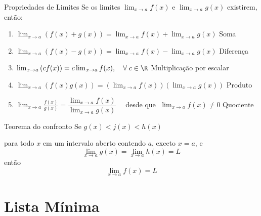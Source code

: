\documentclass[fleqn,utf8,aspectratio=169,12pt,ignorenonframetext]{beamer}
\begin{document}
\begin{frame}{Propriedades de Limites}
  Se os limites \(\lim_{x\to a}f(x)\) e  \(\lim_{x\to a}g(x)\) existirem, então:\\[4mm]
  \pause
  \begin{enumerate}[<+->]
    \item
      \(
        \lim_{x\to a} \left(f(x)+g(x)\right)
        = \lim_{x\to a}f(x) + \lim_{x\to a}g(x)
      \)
      \hfill Soma
      \\[5mm]

    \item
      \(
        \lim_{x\to a} \left(f(x)-g(x)\right)
        = \lim_{x\to a}f(x) - \lim_{x\to a}g(x)
      \)
      \hfill Diferença
      \\[5mm]

    \item
      \(
        \lim_{x\to a} \left(c f(x)\right)
        = c\lim_{x\to a} f(x),\quad \forall\; c\in\R
      \)
      \hfill Multiplicação por escalar
      \\[5mm]

    \item
      \(
        \lim_{x\to a} \left(f(x)g(x)\right)
        = \left(\lim_{x\to a} f(x)\right)\left(\lim_{x\to a} g(x)\right)
      \)
      \hfill Produto
      \\[5mm]

    \item
      \(
        \lim_{x\to a} \frac{f(x)}{g(x)}
        = \dfrac{\displaystyle \lim_{x\to a} f(x)}{\displaystyle \lim_{x\to a} g(x)}\quad
      \)
      desde que $\;\lim_{x\to a} f(x) \neq 0$
      \hfill Quociente
  \end{enumerate}
\end{frame}

\begin{frame}{Teorema do confronto}
  Se \(g(x) < j(x) < h(x)\)

  \pause
  para todo $x$ em um intervalo aberto contendo $a$,
  \pause
  exceto $x = a$,
  \pause
  e
  \[
    \lim_{x\to a} g(x) = \lim_{x\to a} h(x) = L
  \]
  \pause
  então
  \[
   \lim_{x\to a} f(x) = L
  \]
\end{frame}

\section{Lista Mínima}
\end{document}
